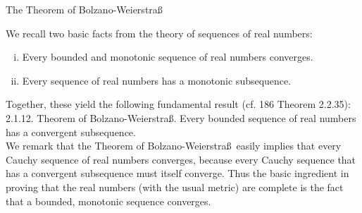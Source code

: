 \documentclass[smaller,hyperref={CJKbookmarks=true}]{beamer}
\begin{document}
\begin{frame}[t]{The Theorem of Bolzano-Weierstra\ss}
\begin{spacing}{1.1}
We recall two basic facts from the theory of sequences of real numbers:
\begin{enumerate}[(i)]
  \item Every bounded and monotonic sequence of real numbers converges.
  \item Every sequence of real numbers has a monotonic subsequence.
\end{enumerate}
Together, these yield the following fundamental result (cf. 186 Theorem 2.2.35):\\[5pt]
\alert{2.1.12. Theorem of Bolzano-Weierstra\ss.} Every bounded sequence of real
numbers has a convergent subsequence.\\[6pt]
We remark that the Theorem of Bolzano-Weierstra\ss ~easily implies that
every Cauchy sequence of real numbers converges, because every Cauchy
sequence that has a convergent subsequence must itself converge. Thus
the basic ingredient in proving that the real numbers (with the usual
metric) are complete is the fact that a bounded, monotonic sequence
converges.
\end{spacing}
\end{frame}
\end{document}
